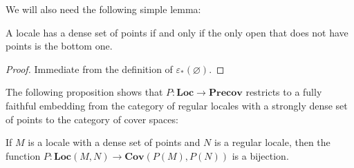 \documentclass[reqno]{amsart}
\theoremstyle{definition}
\theoremstyle{remark}
\numberwithin{figure}{section}
\newcommand{\cat}[1]{\mathbf{#1}}
\begin{document}
We will also need the following simple lemma:

\begin{lem}
A locale has a dense set of points if and only if the only open that does not have points is the bottom one.
\end{lem}
\begin{proof}
Immediate from the definition of $\varepsilon_*(\varnothing)$.
\end{proof}

The following proposition shows that $P : \cat{Loc} \to \cat{Precov}$ restricts to a fully faithful embedding from the category of regular locales with a strongly dense set of points to the category of cover spaces:

\begin{prop}[locale-ff]
If $M$ is a locale with a dense set of points and $N$ is a regular locale, then the function $P : \cat{Loc}(M,N) \to \cat{Cov}(P(M),P(N))$ is a bijection.
\end{prop}
\end{document}
